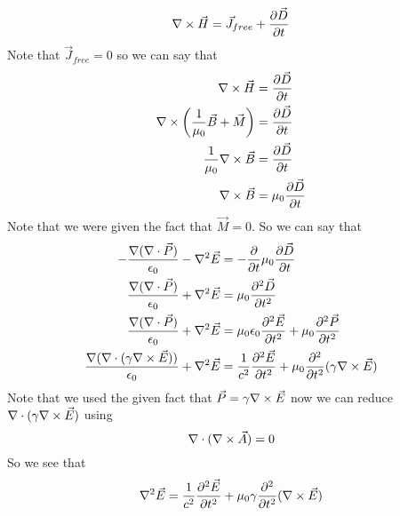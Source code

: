 \documentclass[11pt]{article}
\numberwithin{equation}{section}
\newcommand{\grad}{\bold\nabla}
\newcommand{\vecE}{\vec{E}}
\begin{document}
\begin{enumerate}[(a)]
\begin{equation}
\grad\times\vec{H} = \vec{J}_{free}+\frac{\partial\vec{D}}{\partial t}
\label{CurlH}
\end{equation}
Note that $\vec{J}_{free} = 0$ so we can say that
\begin{align*}
\grad\times\vec{H} &= \frac{\partial\vec{D}}{\partial t}\\
\grad\times\left(\frac{1}{\mu_0}\vec{B}+\vec{M}\right) &= \frac{\partial\vec{D}}{\partial t}\\
\frac{1}{\mu_0}\grad\times\vec{B} &= \frac{\partial\vec{D}}{\partial t}\\
\grad\times\vec{B} &= \mu_0\frac{\partial\vec{D}}{\partial t}\\
\end{align*}
Note that we were given the fact that $\vec{M} = 0$. So we can say that
\begin{align*}
-\frac{\grad(\grad\cdot\vec{P})}{\epsilon_0} - \grad^2\vec{E} &= -\frac{\partial}{\partial t}\mu_0\frac{\partial\vec{D}}{\partial t}\\
\frac{\grad(\grad\cdot\vec{P})}{\epsilon_0} + \grad^2\vec{E} &= \mu_0\frac{\partial^2\vec{D}}{\partial t^2}\\
\frac{\grad(\grad\cdot\vec{P})}{\epsilon_0} + \grad^2\vec{E} &= \mu_0\epsilon_0\frac{\partial^2\vec{E}}{\partial t^2} +\mu_0\frac{\partial^2\vec{P}}{\partial t^2} \\
\frac{\grad(\grad\cdot(\gamma\grad\times\vec{E}))}{\epsilon_0} + \grad^2\vec{E} &= \frac{1}{c^2}\frac{\partial^2\vec{E}}{\partial t^2} +\mu_0\frac{\partial^2}{\partial t^2}(\gamma\grad\times\vec{E}) \\
\end{align*}
Note that we used the given fact that $\vec{P} =\gamma\grad\times\vecE$ now we can reduce $\grad\cdot(\gamma\grad\times\vec{E})$ using
\begin{equation}
\grad\cdot(\grad\times\vec{A}) = 0
\end{equation}
So we see that 
$$\grad^2\vec{E}=\frac{1}{c^2}\frac{\partial^2\vec{E}}{\partial t^2} +\mu_0\gamma\frac{\partial^2}{\partial t^2}(\grad\times\vec{E})$$


\end{enumerate}
\end{document}
